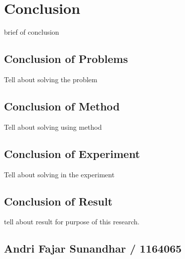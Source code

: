 \chapter{Conclusion}
brief of conclusion

\section{Conclusion of Problems}
Tell about solving the problem

\section{Conclusion of Method}
Tell about solving using method

\section{Conclusion of Experiment}
Tell about solving in the experiment

\section{Conclusion of Result}
tell about result for purpose of this research.

\section{Andri Fajar Sunandhar / 1164065}
